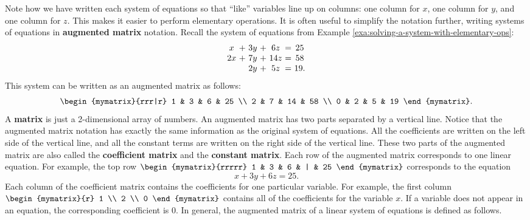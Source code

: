 Note how we have written each system of equations so that ``like''
variables line up on columns: one column for $x$, one column for $y$,
and one column for $z$. This makes it easier to perform elementary
operations. It is often useful to simplify the notation further,
writing systems of equations in \textbf{augmented matrix} notation. Recall the
system of equations from Example \ref{exa:solving-a-system-with-elementary-ops}:
\begin{equation*}
\begin{array}{c@{~}c@{~}c@{~}c@{~}c@{~}c@{~}c}
x&+&3y&+&6z&=&25 \\
2x&+&7y&+&14z&=&58 \\
&&2y&+&5z&=&19.
\end{array}
\end{equation*}
This system can be written as an augmented matrix as follows:
\begin{equation*}
\begin{mymatrix}{rrr|r}
1 & 3 & 6 & 25 \\
2 & 7 & 14 & 58 \\
0 & 2 & 5 & 19
\end{mymatrix}.
\end{equation*}
A \textbf{matrix} is just a 2-dimensional array of
numbers. An augmented matrix has two parts separated by a vertical
line. Notice that the augmented matrix notation has exactly the same
information as the original system of equations. All the coefficients
are written on the left side of the vertical line, and all the
constant terms are written on the right side of the vertical
line. These two parts of the augmented matrix are also called the
\textbf{coefficient matrix}%
 and the \textbf{constant
  matrix}.  Each
row of the augmented matrix corresponds to one linear equation. For
example, the top row $\begin{mymatrix}{rrrrr} 1 & 3 & 6 & | & 25
\end{mymatrix}$
 corresponds to the equation
\begin{equation*}
x+3y+6z=25.
\end{equation*}
Each column of the coefficient matrix contains the coefficients
for one particular variable. For example, the first column $\begin{mymatrix}{r}
1 \\
2 \\
0
\end{mymatrix}$ contains all of the coefficients for the variable $x$. If a
variable does not appear in an equation, the corresponding coefficient
is $0$. In general, the augmented matrix of a linear system of
equations is defined as follows.

